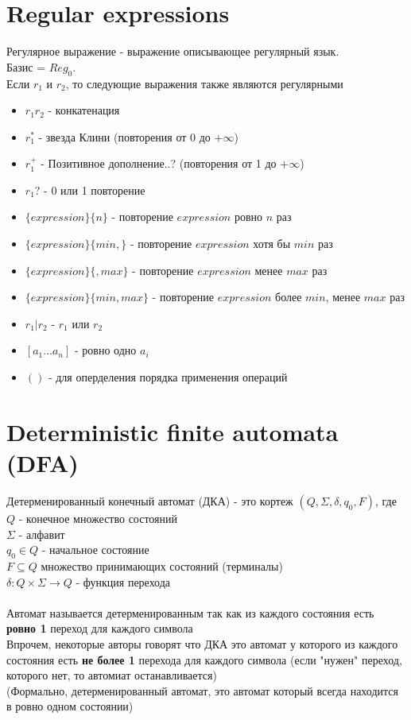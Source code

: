 \documentclass{article}
\begin{document}
	\section{Regular expressions}
	Регулярное выражение - выражение описывающее регулярный язык.\\ 
	Базис = $Reg_0$.\\
	Если $r_1$ и $r_2$, то следующие выражения также являются регулярными\\
	\begin{itemize}
		\item $r_1r_2$ - конкатенация
		\item $r^{*}_1$ - звезда Клини (повторения от 0 до $+\infty$)
		\item $r^{+}_1$ - Позитивное дополнение..? (повторения от 1 до $+\infty$)
		\item $r_1?$ - 0 или 1 повторение
		\item $\{expression\}\{n\}$ - повторение $expression$ ровно $n$ раз
		\item $\{expression\}\{min,\}$ - повторение $expression$ хотя бы $min$ раз
		\item $\{expression\}\{, max\}$ - повторение $expression$ менее $max$ раз
		\item $\{expression\}\{min, max\}$ - повторение $expression$ более $min$, менее $max$ раз
		\item $r_1 | r_2$ - $r_1$ или $r_2$
		\item $[a_1 ... a_n]$ - ровно одно $a_i$
		\item $()$ - для оперделения порядка применения операций
	\end{itemize}
	
	\section{Deterministic finite automata (DFA)}
	Детерменированный конечный автомат (ДКА) - это кортеж $(Q, \Sigma, \delta, q_0, F)$, где\\
	$Q$ - конечное множество состояний\\
	$\Sigma$ - алфавит\\
	$q_0\in Q$ - начальное состояние\\
	$F\subseteq Q$ множество принимающих состояний (терминалы)\\
	$\delta\colon Q\times\Sigma\to Q$ - функция перехода\\
	\noindent\\
	Автомат называется детерменированным так как из каждого состояния есть \textbf{ровно 1} переход для каждого символа\\
	Впрочем, некоторые авторы говорят что ДКА это автомат у которого из каждого состояния есть \textbf{не более 1} перехода для каждого символа (если "нужен" переход, которого нет, то автомиат останавливается)\\ 
	(Формально, детерменированный автомат, это автомат который всегда находится в ровно одном состоянии)\\
	
\end{document}
